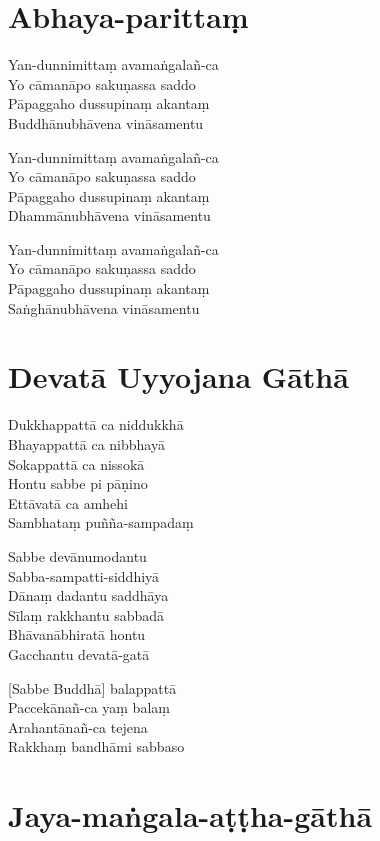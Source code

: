 \chapter{Abhaya-parittaṃ}%

\begin{paritta}
Yan-dunnimittaṃ avamaṅgalañ-ca\\
Yo cāmanāpo sakuṇassa saddo\\
Pāpaggaho dussupinaṃ akantaṃ\\
Buddhānubhāvena vināsamentu

Yan-dunnimittaṃ avamaṅgalañ-ca\\
Yo cāmanāpo sakuṇassa saddo\\
Pāpaggaho dussupinaṃ akantaṃ\\
Dhammānubhāvena vināsamentu

Yan-dunnimittaṃ avamaṅgalañ-ca\\
Yo cāmanāpo sakuṇassa saddo\\
Pāpaggaho dussupinaṃ akantaṃ\\
Saṅghānubhāvena vināsamentu
\end{paritta}

\chapter{Devatā Uyyojana Gāthā}%

\begin{paritta}
Dukkhappattā ca niddukkhā\\
Bhayappattā ca nibbhayā\\
Sokappattā ca nissokā\\
Hontu sabbe pi pāṇino\\
Ettāvatā ca amhehi\\
Sambhataṃ puñña-sampadaṃ

Sabbe devānumodantu\\
Sabba-sampatti-siddhiyā\\
Dānaṃ dadantu saddhāya\\
Sīlaṃ rakkhantu sabbadā\\
Bhāvanābhiratā hontu\\
Gacchantu devatā-gatā

[Sabbe Buddhā] balappattā\\
Paccekānañ-ca yaṃ balaṃ\\
Arahantānañ-ca tejena\\
Rakkhaṃ bandhāmi sabbaso
\end{paritta}

\chapter{Jaya-maṅgala-aṭṭha-gāthā}%


